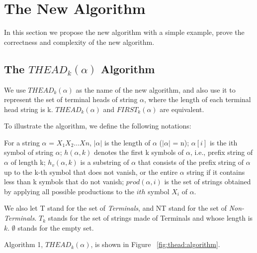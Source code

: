 \documentclass{sig-alternate-05-2015}
\begin{document}
\section{The New Algorithm}
In this section we propose the new algorithm \cite{pager08terminal} with a simple example, prove
the correctness and complexity of the new algorithm.

\subsection{The $THEAD_k(\alpha)$ Algorithm}
We use $THEAD_k(\alpha)$ as the name of the new algorithm, and
also use it to represent the set of terminal heads of string $\alpha$,
where the length of each terminal head string is k. $THEAD_k(\alpha)$ and $FIRST_k(\alpha)$ are equivalent.

To illustrate the algorithm, we define the following notations:

For a string $\alpha$ = $X_1X_2 \ldots Xn$, $|\alpha|$ is the length of $\alpha$ ($| \alpha |$ = n);
$\alpha[i]$ is the ith symbol of string $\alpha$; $h(\alpha, k)$ denotes the first k
symbols of $\alpha$, i.e., prefix string of $\alpha$ of length k; $h_v(\alpha, k)$ is a
substring of $\alpha$ that consists of the prefix string of $\alpha$ up to
the k-th symbol that does not vanish, or the entire $\alpha$ string if
it contains less than k symbols that do not vanish; $prod(\alpha, i)$
is the set of strings obtained by applying all possible productions
to the $ith$ symbol $X_i$ of $\alpha$.

We also let T stand for the set of \textit{Terminals}, and NT
stand for the set of \textit{Non-Terminals}. $T_k$ stands for the set of
strings made of Terminals and whose length is $k$. $\emptyset$ stands
for the empty set.

Algorithm 1, $THEAD_k(\alpha)$, is shown in Figure ~\ref{fig:thead:algorithm}.
\end{document}
